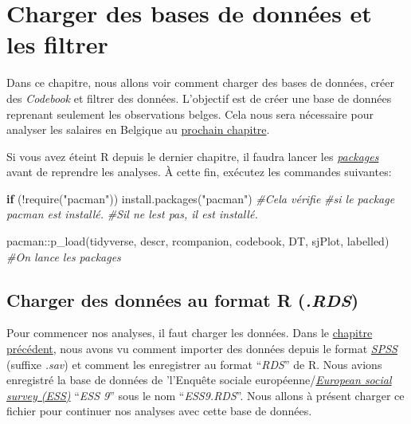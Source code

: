 \documentclass[
]{book}
\newenvironment{Shaded}{\begin{snugshade}}{\end{snugshade}}
\newcommand{\CommentTok}[1]{\textcolor[rgb]{0.56,0.35,0.01}{\textit{#1}}}
\newcommand{\ControlFlowTok}[1]{\textcolor[rgb]{0.13,0.29,0.53}{\textbf{#1}}}
\newcommand{\FunctionTok}[1]{\textcolor[rgb]{0.00,0.00,0.00}{#1}}
\newcommand{\NormalTok}[1]{#1}
\newcommand{\SpecialCharTok}[1]{\textcolor[rgb]{0.00,0.00,0.00}{#1}}
\newcommand{\StringTok}[1]{\textcolor[rgb]{0.31,0.60,0.02}{#1}}
\begin{document}
\hypertarget{charge_code_filtrer}{%
\chapter{Charger des bases de données et les filtrer}\label{charge_code_filtrer}}

Dans ce chapitre,
nous allons voir comment charger des bases de données, créer des \emph{Codebook} et filtrer des données. L'objectif est de créer une base de données reprenant seulement les observations belges. Cela nous sera nécessaire pour analyser les salaires en Belgique au \protect\hyperlink{salaire_belge_stat_desc}{prochain chapitre}.

Si vous avez éteint R depuis le dernier chapitre, il faudra lancer les \protect\hyperlink{packages}{\emph{packages}} avant de reprendre les analyses. À cette fin, exécutez les commandes suivantes:

\begin{Shaded}
\begin{Highlighting}[]
\ControlFlowTok{if}\NormalTok{ (}\SpecialCharTok{!}\FunctionTok{require}\NormalTok{(}\StringTok{"pacman"}\NormalTok{)) }\FunctionTok{install.packages}\NormalTok{(}\StringTok{"pacman"}\NormalTok{) }\CommentTok{\#Cela vérifie}
                             \CommentTok{\#si le package pacman est installé.}
                             \CommentTok{\#S\textquotesingle{}il ne l\textquotesingle{}est pas, il est installé.}

\NormalTok{pacman}\SpecialCharTok{::}\FunctionTok{p\_load}\NormalTok{(tidyverse, descr, rcompanion, codebook,}
\NormalTok{               DT, sjPlot, labelled) }\CommentTok{\#On lance les packages}
\end{Highlighting}
\end{Shaded}

\hypertarget{charger-des-donnuxe9es-au-format-r-.rds}{%
\section{\texorpdfstring{Charger des données au format R (\emph{.RDS})}{Charger des données au format R (.RDS)}}\label{charger-des-donnuxe9es-au-format-r-.rds}}

Pour commencer nos analyses, il faut charger les données. Dans le \protect\hyperlink{import_donnees}{chapitre précédent}, nous avons vu comment importer des données depuis le format \href{https://www.ibm.com/fr-fr/products/spss-statistics}{\emph{SPSS}} (suffixe \emph{.sav}) et comment les enregistrer au format ``\emph{RDS}'' de R. Nous avions enregistré la base de données de 'l'Enquête sociale européenne/\href{https://www.europeansocialsurvey.org/}{\emph{European social survey (ESS)}} ``\emph{ESS 9}'' sous le nom ``\emph{ESS9.RDS}''. Nous allons à présent charger ce fichier pour continuer nos analyses avec cette base de données.
\end{document}
